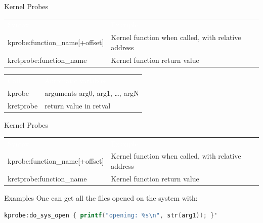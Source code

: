 \begin{reveals}
\begin{frame}[c,fragile]{Kernel Probes}
  \begin{center}
      \color{deepblue}
    \begin{tabular}{|p{}p{}|}
      \arrayrulecolor{deepblue}
          {\cellcolor{deepblue}\textcolor{white}{Syntax}} &
                                                          {\cellcolor{deepblue}\textcolor{white}{Example}} \\
      kprobe:function\_name[+offset] & Kernel function when called, with relative address \\
      kretprobe:function\_name & Kernel function return value\\\hline
    \end{tabular}
  \end{center}
  \vfill
  \begin{center}
      \color{deepblue}
    \begin{tabular}{|ll|}
      \arrayrulecolor{deepblue}
          {\cellcolor{deepblue}\textcolor{white}{Call}} &
                                                          {\cellcolor{deepblue}\textcolor{white}{Automatic variables}} \\
      kprobe&  arguments arg0, arg1, \ldots, argN\\
      kretprobe&  return value in retval\\\hline
    \end{tabular}
  \end{center}
\end{frame}
\begin{frame}[c,fragile]{Kernel Probes}
  
  \begin{center}
      \color{deepblue}
    \begin{tabular}{|p{}p{}|}
      \arrayrulecolor{deepblue}
          {\cellcolor{deepblue}\textcolor{white}{Syntax}} &
                                                          {\cellcolor{deepblue}\textcolor{white}{Example}} \\
      kprobe:function\_name[+offset] & Kernel function when called, with relative address \\
      kretprobe:function\_name & Kernel function return value\\\hline
    \end{tabular}
  \end{center}
  \vfill
  \begin{block}{Examples}
    One can get all the files opened on the system with:
\begin{lstlisting}[language=Awk]
kprobe:do_sys_open { printf("opening: %s\n", str(arg1)); }'
\end{lstlisting}
  \end{block}
\end{frame}




\end{reveals}
